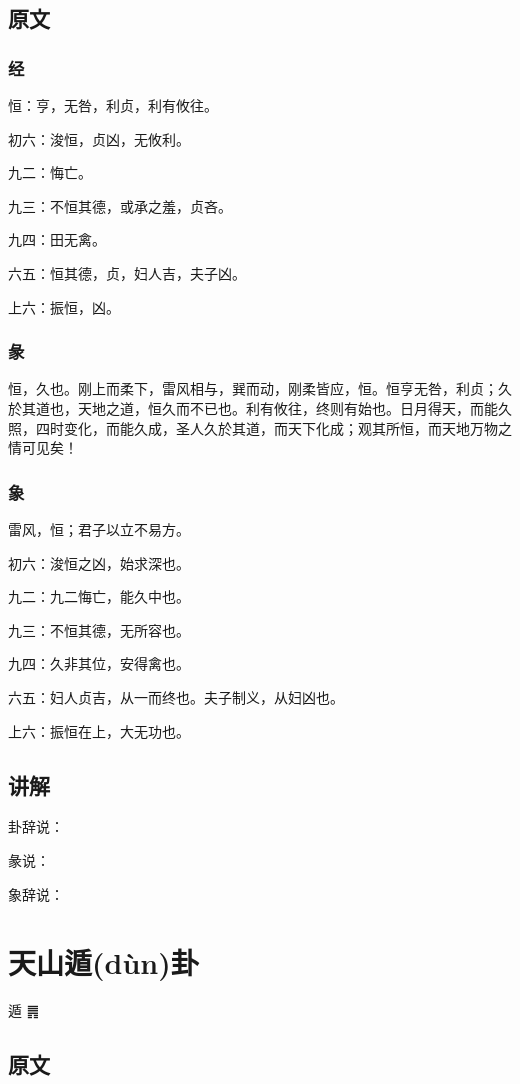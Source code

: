 \documentclass[12pt,oneside]{book}
\begin{document}
\section{原文}

\subsection{经}
恒：亨，无咎，利贞，利有攸往。

初六：浚恒，贞凶，无攸利。

九二：悔亡。

九三：不恒其德，或承之羞，贞吝。

九四：田无禽。

六五：恒其德，贞，妇人吉，夫子凶。

上六：振恒，凶。

\subsection{彖}
恒，久也。刚上而柔下，雷风相与，巽而动，刚柔皆应，恒。恒亨无咎，利贞；久於其道也，天地之道，恒久而不已也。利有攸往，终则有始也。日月得天，而能久照，四时变化，而能久成，圣人久於其道，而天下化成；观其所恒，而天地万物之情可见矣！

\subsection{象}
雷风，恒；君子以立不易方。

初六：浚恒之凶，始求深也。

九二：九二悔亡，能久中也。

九三：不恒其德，无所容也。

九四：久非其位，安得禽也。

六五：妇人贞吉，从一而终也。夫子制义，从妇凶也。

上六：振恒在上，大无功也。

\section{讲解}
卦辞说：

彖说：

象辞说：

\chapter{天山遁(dùn)卦}
遁 {\Large ䷠}

\section{原文}
\end{document}
